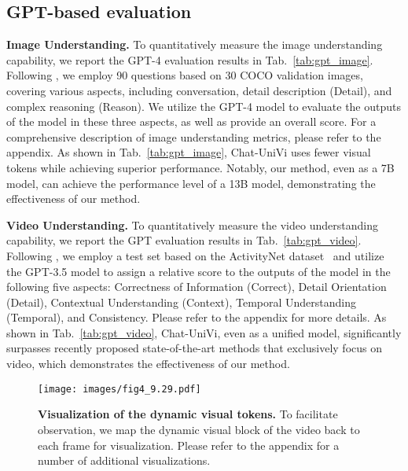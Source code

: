 \documentclass[10pt,twocolumn,letterpaper]{article}
\newcommand{\myparagraph}[1]{\textbf{#1}\hspace{1.8ex}}
\begin{document}
\subsection{GPT-based evaluation}
\noindent \myparagraph{Image Understanding.} To quantitatively measure the image understanding capability, we report the GPT-4 evaluation results in Tab.~\ref{tab:gpt_image}. Following \citet{liu2023visual,zhang2023llavar}, we employ 90 questions based on 30 COCO validation images, covering various aspects, including conversation, detail description (Detail), and complex reasoning (Reason). We utilize the GPT-4 model to evaluate the outputs of the model in these three aspects, as well as provide an overall score. For a comprehensive description of image understanding metrics, please refer to the appendix. As shown in Tab.~\ref{tab:gpt_image}, Chat-UniVi uses fewer visual tokens while achieving superior performance. Notably, our method, even as a 7B model, can achieve the performance level of a 13B model, demonstrating the effectiveness of our method.

\noindent \myparagraph{Video Understanding.} To quantitatively measure the video understanding capability, we report the GPT evaluation results in Tab.~\ref{tab:gpt_video}. Following \citet{maaz2023video}, we employ a test set based on the ActivityNet dataset~\cite{caba2015activitynet} and utilize the GPT-3.5 model to assign a relative score to the outputs of the model in the following five aspects: Correctness of Information (Correct), Detail Orientation (Detail), Contextual Understanding (Context), Temporal Understanding (Temporal), and Consistency. Please refer to the appendix for more details. As shown in Tab.~\ref{tab:gpt_video}, Chat-UniVi, even as a unified model, significantly surpasses recently proposed state-of-the-art methods that exclusively focus on video, which demonstrates the effectiveness of our method.

\begin{figure*}[t]
\centering
\texttt{[image: images/fig4\_9.29.pdf]}
\vspace{-1.5em}
\caption{\textbf{Visualization of the dynamic visual tokens.} To facilitate observation, we map the dynamic visual block of the video back to each frame for visualization. Please refer to the appendix for a number of additional visualizations.}
\vspace{-.8em}
\label{fig:visualization}
\end{figure*}
\end{document}
